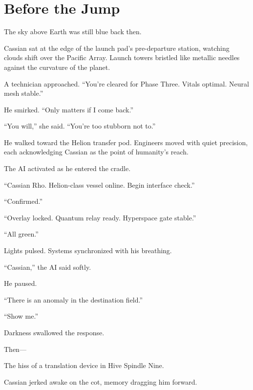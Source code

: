 \chapter{Before the Jump}

The sky above Earth was still blue back then.

Cassian sat at the edge of the launch pad’s pre-departure station, watching clouds shift over the Pacific Array. Launch towers bristled like metallic needles against the curvature of the planet.

A technician approached. “You’re cleared for Phase Three. Vitals optimal. Neural mesh stable.”

He smirked. “Only matters if I come back.”

“You will,” she said. “You’re too stubborn not to.”

He walked toward the Helion transfer pod. Engineers moved with quiet precision, each acknowledging Cassian as the point of humanity’s reach.

The AI activated as he entered the cradle.

“Cassian Rho. Helion-class vessel online. Begin interface check.”

“Confirmed.”

“Overlay locked. Quantum relay ready. Hyperspace gate stable.”

“All green.”

Lights pulsed. Systems synchronized with his breathing.

“Cassian,” the AI said softly.

He paused.

“There is an anomaly in the destination field.”

“Show me.”

Darkness swallowed the response.

Then—

The hiss of a translation device in Hive Spindle Nine.

Cassian jerked awake on the cot, memory dragging him forward.
